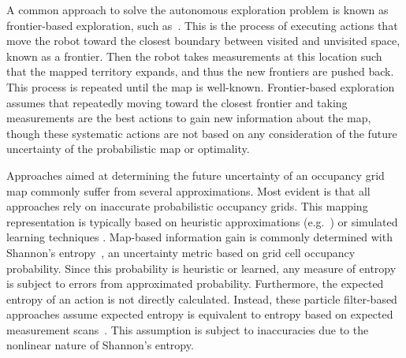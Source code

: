 \documentclass[letterpaper, 10pt, conference]{ieeeconf}
\begin{document}
A common approach to solve the autonomous exploration problem is known as frontier-based exploration, such as~\cite{Yam97,Yam98}. This is the process of executing actions that move the robot toward the closest boundary between visited and unvisited space, known as a frontier.
Then the robot takes measurements at this location such that the mapped territory expands, and thus the new frontiers are pushed back. This process is repeated until the map is well-known.
Frontier-based exploration assumes that repeatedly moving toward the closest frontier and taking measurements are the best actions to gain new information about the map, though these systematic actions are not based on any consideration of the future uncertainty of the probabilistic map or optimality.


Approaches aimed at determining the future uncertainty of an occupancy grid map commonly suffer from several approximations.
Most evident is that all approaches rely on inaccurate probabilistic occupancy grids. This mapping representation is typically based on heuristic approximations (e.g.~\cite{MorElf85,Elf89,ChoLynHutKanBurKavThr05,And09,PirRutBisSch11}) or simulated learning techniques \cite{ThrBurFox05,Thr01}. Map-based information gain is commonly determined with Shannon's entropy~\cite{StaGriBur05}, an uncertainty metric based on grid cell occupancy probability. Since this probability is heuristic or learned, any measure of entropy is subject to errors from approximated probability.
Furthermore, the expected entropy of an action is not directly calculated. Instead, these particle filter-based approaches assume expected entropy is equivalent to entropy based on expected measurement scans~\cite{JohStaPfaBur07}. This assumption is subject to inaccuracies due to the nonlinear nature of Shannon's entropy. %
\end{document}
